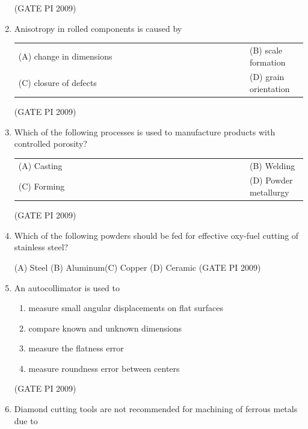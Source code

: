\documentclass[journal,12pt,onecolumn]{IEEEtran}
\theoremstyle{remark}
\begin{document}
\begin{enumerate}[label=Q.\arabic*, leftmargin=*]
\hfill (GATE PI 2009)
\item Anisotropy in rolled components is caused by
\begin{multicols}{2}
\begin{tabular}[t]{p{0.8\linewidth} p{0.9\linewidth}}
(A) change in dimensions & (B) scale formation \\
(C) closure of defects & (D) grain orientation \\
\end{tabular}
\end{multicols}
\hfill (GATE PI 2009)
\item Which of the following processes is used to manufacture products with controlled porosity?
\begin{multicols}{2}
\begin{tabular}[t]{p{0.8\linewidth} p{0.9\linewidth}}
(A) Casting & (B) Welding \\
(C) Forming & (D) Powder metallurgy \\
\end{tabular}
\end{multicols}
\hfill (GATE PI 2009)
\item Which of the following powders should be fed for effective oxy-fuel cutting of stainless steel?

(A) Steel \hfill (B) Aluminum\hfill (C) Copper \hfill (D) Ceramic 
\hfill (GATE PI 2009)
\item An autocollimator is used to

\begin{enumerate}[label=(\Alph*)]
\item measure small angular displacements on flat surfaces
\item compare known and unknown dimensions
\item measure the flatness error
\item measure roundness error between centers
\end{enumerate}
\hfill (GATE PI 2009)
\item Diamond cutting tools are not recommended for machining of ferrous metals due to


\end{enumerate}
\end{document}
